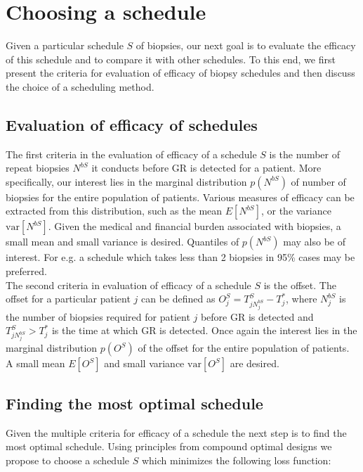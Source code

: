 
\section{Choosing a schedule}
\label{sec : choosing_schedule}
Given a particular schedule $S$ of biopsies, our next goal is to evaluate the efficacy of this schedule and to compare it with other schedules. To this end, we first present the criteria for evaluation of efficacy of biopsy schedules and then discuss the choice of a scheduling method.

\subsection{Evaluation of efficacy of schedules}
The first criteria in the evaluation of efficacy of a schedule $S$ is the number of repeat biopsies $N^{bS}$ it conducts before GR is detected for a patient. More specifically, our interest lies in the marginal distribution $p(N^{bS})$ of number of biopsies for the entire population of patients. Various measures of efficacy can be extracted from this distribution, such as the mean $E[N^{bS}]$, or the variance $\mbox{var}[N^{bS}]$. Given the medical and financial burden associated with biopsies, a small mean and small variance is desired. Quantiles of $p(N^{bS})$ may also be of interest. For e.g. a schedule which takes less than 2 biopsies in 95\% cases may be preferred.\\

The second criteria in evaluation of efficacy of a schedule $S$ is the offset. The offset for a particular patient $j$ can be defined as $O^S_j = T^S_{j{N^{bS}_j}} - T^*_j$, where $N^{bS}_j$ is the number of biopsies required for patient $j$ before GR is detected and $T^S_{j{N^{bS}_j}} > T^*_j$ is the time at which GR is detected. Once again the interest lies in the marginal distribution $p(O^S)$ of the offset for the entire population of patients. A small mean $E[O^S]$ and small variance $\mbox{var}[O^S]$ are desired.

\subsection{Finding the most optimal schedule}
Given the multiple criteria for efficacy of a schedule the next step is to find the most optimal schedule. Using principles from compound optimal designs \citep{lauter1976optimal} we propose to choose a schedule $S$ which minimizes the following loss function:

